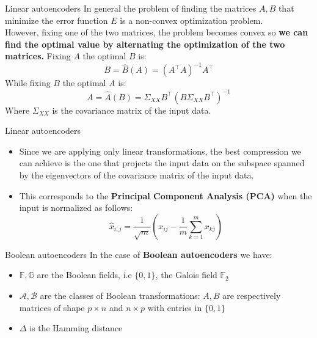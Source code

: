 \documentclass{beamer}
\begin{document}
\begin{frame}{Linear autoencoders}
    In general the problem of finding the matrices $A,B$ that minimize the error function $E$ is a non-convex optimization problem.\\
    \vspace{0.3cm}
    However, fixing one of the two matrices, the problem becomes convex so \textbf{we can find the optimal value by alternating the optimization of the two matrices.}
    Fixing $A$ the optimal $B$ is: 
    \[
        B = \hat{B}(A) = (A^\intercal A)^{-1} A^\intercal 
    \]
    While fixing $B$ the optimal $A$ is:
    \[
        A = \hat{A}(B) = \Sigma_{XX}B^\intercal (B\Sigma_{XX}B^\intercal)^{-1}
    \]
    Where $\Sigma_{XX}$ is the covariance matrix of the input data.
\end{frame}

\begin{frame}{Linear autoencoders}
    \begin{itemize}
        \item Since we are applying only linear transformations, the best compression we can achieve is the one that projects the input data on the subspace spanned by the eigenvectors of the covariance matrix of the input data.\\

        \item This corresponds to the \textbf{Principal Component Analysis (PCA)} when the input is normalized as follows:
        \[
            \hat{x}_{i,j} = \dfrac{1}{\sqrt{m}}\left(x_{ij} - \dfrac{1}{m}\sum_{k=1}^m x_{kj}\right)
        \]    
    \end{itemize}
    
\end{frame}


\begin{frame}{Boolean autoencoders}
    In the case of \textbf{Boolean autoencoders} we have:
    \begin{itemize}
        \item $\mathbb{F},\mathbb{G}$ are the Boolean fields, i.e $\{0,1\}$, the Galois field $\mathbb{F}_2$
        \item $\mathcal{A},\mathcal{B}$ are the classes of Boolean transformations: $A,B$ are respectively matrices of shape $p \times n$ and $n \times p$ with entries in $\{0,1\}$
        \item $\Delta$ is the Hamming distance
    \end{itemize}
\end{frame}
\end{document}
